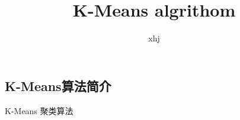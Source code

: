 \documentclass{article}
\author{xhj}
\title{K-Means algrithom}
\begin{document}
	\maketitle
	\begin{CJK}{UTF8}{gkai}
	\section{K-Means算法简介}
	K-Means 聚类算法
	
	
	
	\end{CJK}
\end{document}
